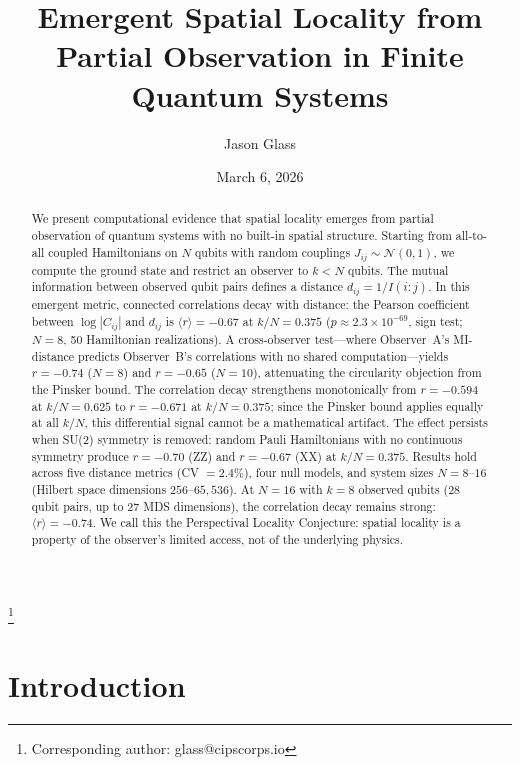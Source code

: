 \documentclass[aps,pra,twocolumn,superscriptaddress]{revtex4-2}
\begin{document}
\title{Emergent Spatial Locality from Partial Observation in Finite Quantum Systems}

\author{Jason Glass}
\thanks{Corresponding author: glass@cipscorps.io}

\date{March 6, 2026}

\begin{abstract}
We present computational evidence that spatial locality emerges from partial observation of quantum systems with no built-in spatial structure.
Starting from all-to-all coupled Hamiltonians on $N$ qubits with random couplings $J_{ij} \sim \mathcal{N}(0,1)$, we compute the ground state and restrict an observer to $k < N$ qubits.
The mutual information between observed qubit pairs defines a distance $d_{ij} = 1/I(i{:}j)$.
In this emergent metric, connected correlations decay with distance: the Pearson coefficient between $\log|C_{ij}|$ and $d_{ij}$ is $\langle r \rangle = -0.67$ at $k/N = 0.375$ ($p \approx 2.3 \times 10^{-69}$, sign test; $N = 8$, 50 Hamiltonian realizations).
A cross-observer test---where Observer~A's MI-distance predicts Observer~B's correlations with no shared computation---yields $r = -0.74$ ($N = 8$) and $r = -0.65$ ($N = 10$), attenuating the circularity objection from the Pinsker bound. The correlation decay strengthens monotonically from $r = -0.594$ at $k/N = 0.625$ to $r = -0.671$ at $k/N = 0.375$; since the Pinsker bound applies equally at all $k/N$, this differential signal cannot be a mathematical artifact.
The effect persists when SU(2) symmetry is removed: random Pauli Hamiltonians with no continuous symmetry produce $r = -0.70$ (ZZ) and $r = -0.67$ (XX) at $k/N = 0.375$.
Results hold across five distance metrics (CV $= 2.4\%$), four null models, and system sizes $N = 8$--$16$ (Hilbert space dimensions $256$--$65{,}536$). At $N = 16$ with $k = 8$ observed qubits (28 qubit pairs, up to 27 MDS dimensions), the correlation decay remains strong: $\langle r \rangle = -0.74$.
We call this the Perspectival Locality Conjecture: spatial locality is a property of the observer's limited access, not of the underlying physics.
\end{abstract}

\maketitle

\section{Introduction}
\end{document}
